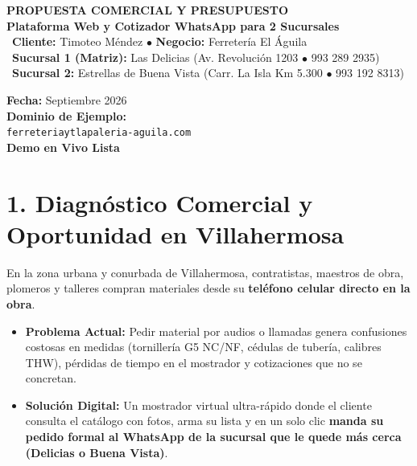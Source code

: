 \documentclass[10pt,letterpaper]{article}
\begin{document}
\begin{tcolorbox}[colback=NavyBlue, colframe=AmberGold, boxrule=1.5pt, arc=2.5mm, top=5pt, bottom=5pt]
    \begin{minipage}[c]{0.70\textwidth}
        {\color{white}\large\textbf{PROPUESTA COMERCIAL Y PRESUPUESTO}}\\[1pt]
        {\color{AmberGold}\small\textbf{Plataforma Web y Cotizador WhatsApp para 2 Sucursales}}\\[3pt]
        {\color{white}\footnotesize\faUserTie\ \textbf{Cliente:} Timoteo Méndez $\bullet$ \textbf{Negocio:} Ferretería El Águila}\\
        {\color{white}\scriptsize\faMapPin\ \textbf{Sucursal 1 (Matriz):} Las Delicias (Av. Revolución 1203 $\bullet$ 993 289 2935)}\\
        {\color{white}\scriptsize\faMapPin\ \textbf{Sucursal 2:} Estrellas de Buena Vista (Carr. La Isla Km 5.300 $\bullet$ 993 192 8313)}
    \end{minipage}
    \hfill
    \begin{minipage}[c]{0.27\textwidth}
        \flushright
        {\color{white}\scriptsize\textbf{Fecha:} Septiembre 2026}\\
        {\color{AmberGold}\scriptsize\textbf{Dominio de Ejemplo:}}\\
        {\color{white}\tiny\texttt{ferreteriaytlapaleria-aguila.com}}\\[3pt]
        {\color{EmeraldGreen}\scriptsize\textbf{Demo en Vivo Lista}}
    \end{minipage}
\end{tcolorbox}

\vspace{0.05cm}

\section*{1. Diagnóstico Comercial y Oportunidad en Villahermosa}
En la zona urbana y conurbada de Villahermosa, contratistas, maestros de obra, plomeros y talleres compran materiales desde su \textbf{teléfono celular directo en la obra}.
\begin{itemize}[leftmargin=*,itemsep=0.5pt]
    \item \textbf{Problema Actual:} Pedir material por audios o llamadas genera confusiones costosas en medidas (tornillería G5 NC/NF, cédulas de tubería, calibres THW), pérdidas de tiempo en el mostrador y cotizaciones que no se concretan.
    \item \textbf{Solución Digital:} Un mostrador virtual ultra-rápido donde el cliente consulta el catálogo con fotos, arma su lista y en un solo clic \textbf{manda su pedido formal al WhatsApp de la sucursal que le quede más cerca (Delicias o Buena Vista)}.
\end{itemize}
\end{document}
